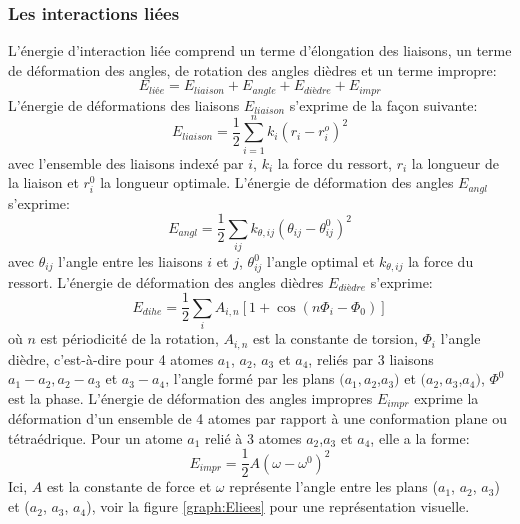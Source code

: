 \subsubsection{Les interactions liées }

L'énergie d'interaction liée comprend un terme d'élongation des liaisons, un terme de déformation des angles, de rotation des angles dièdres et un terme \og impropre\fg:
\begin{equation}
  E_{liée} = E_{liaison} + E_{angle} +E_{dièdre} + E_{impr}
\end{equation}
L'énergie de déformations des liaisons $E_{liaison}$ s'exprime de la façon suivante:
\begin{equation}
  E_{liaison} = \frac{1}{2} \sum_{i=1}^{n} k_{i} (r_i - r^o_i)^2
\end{equation}
avec l'ensemble des liaisons indexé par $i$, $k_{i}$ la force du ressort, $r_{i}$ la longueur de la liaison et $r^0_i$ la longueur optimale. L'énergie de déformation des angles $E_{angl}$ s'exprime:
\begin{equation}
  E_{angl} =\frac{1}{2} \sum_{ij}k_{\theta,ij}(\theta_{ij} - \theta_{ij}^0)^2
\end{equation}
avec $\theta_{ij}$ l'angle entre les liaisons $i$ et $j$, $\theta_{ij}^0$ l'angle optimal et $k_{\theta,ij}$ la force du ressort.
L'énergie de déformation des angles dièdres $E_{dièdre}$ s'exprime:
\begin{equation}
E_{dihe} = \frac{1}{2}\sum_{i} A_{i,n}[ 1 + \cos(n\Phi_i - \Phi_0)]
\end{equation}
où $n$ est périodicité de la rotation, $A_{i,n}$ est la constante de torsion, $\Phi_i$ l'angle dièdre, c'est-à-dire pour 4 atomes $a_1$, $a_2$, $a_3$ et $a_4$, reliés par 3 liaisons $a_1-a_2, a_2-a_3$ et $ a_3-a_4$, l'angle formé par les plans $(a_1,a_2$,$a_3)$ et $(a_2,a_3$,$a_4)$, $\Phi^0$ est la phase. L'énergie de déformation des angles impropres $E_{impr}$ exprime la déformation d'un  ensemble  de 4 atomes  par rapport à une conformation plane ou tétraédrique. Pour un atome $a_1$ relié à 3 atomes $a_2$,$a_3$ et $a_4$, elle a la forme:
\begin{equation}
  E_{impr}= \frac{1}{2}A(\omega - \omega^0)^2
\end{equation}
Ici, $A$ est la constante de force et $\omega$ représente l'angle entre les plans ($a_1$, $a_2$, $a_3$) et ($a_2$, $a_3$, $a_4$), voir la figure \ref{graph:Eliees} pour une représentation visuelle.


